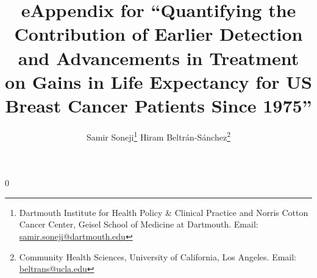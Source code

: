 \documentclass[11pt,letterpaper]{article}
\theoremstyle{plain}
\theoremstyle{remark}
\numberwithin{equation}{section}
\begin{document}
\newcommand\spacingset[1]{\renewcommand{\baselinestretch}%
{#1}\small\normalsize}
\spacingset{1}

\newcommand{\blind}{0} \newcommand{\tit}{eAppendix for ``Quantifying the Contribution of Earlier Detection and Advancements in Treatment on Gains in Life Expectancy for US Breast Cancer Patients Since 1975''}

\blind

 {\title{\bf \tit}
 
  \author{Samir Soneji\thanks{Dartmouth Institute for Health Policy \&
      Clinical Practice and Norris Cotton Cancer Center,
      Geisel School of Medicine at Dartmouth. Email: \href{mailto:samir.soneji@dartmouth.edu}{samir.soneji@dartmouth.edu}}
  \quad \quad 
  Hiram Beltr\'{a}n-S\'{a}nchez\thanks{Community Health Sciences, University of California, Los Angeles. Email:
    \href{mailto:beltrans@ucla.edu}{beltrans@ucla.edu}}}

\date{ }

\maketitle} \fi



\end{document}
